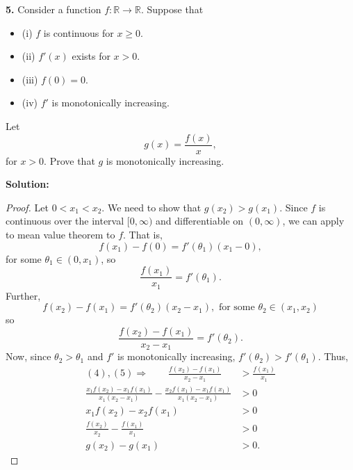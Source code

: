 \documentclass[11pt]{article}
\begin{document}
{\bf 5.} Consider a function $f:\mathbb{R} \rightarrow \mathbb{R}$. Suppose that 
\begin{itemize}[label={},leftmargin=4mm, itemsep=0.5em, parsep=1em]
  \item (i) $f$ is continuous for $x \geq 0$.
  \item (ii) $f'(x)$ exists for $x > 0$.
  \item (iii) $f(0) = 0$.
  \item (iv) $f'$ is monotonically increasing.
\end{itemize}
Let 
\[ g(x) = \frac{f(x)}{x}, \]
for $x > 0$. Prove that $g$ is monotonically increasing.

{\bf Solution:} 
\begin{proof}
  Let $0 < x_{1} < x_{2}$. We need to show that $g(x_{2}) > g(x_{1})$. Since $f$
  is continuous over the interval $[0, \infty)$ and differentiable on $(0,
    \infty)$, we can apply to mean value theorem to $f$. That is,
  \[ f(x_{1}) - f(0) = f'(\theta_{1})(x_{1} - 0), \]
  for some $\theta_{1} \in (0, x_{1})$, so 
  \begin{equation}
    \frac{f(x_{1})}{x_{1}} = f'(\theta_{1}).
  \end{equation}
  Further,
  \[ f(x_{2}) - f(x_{1}) = f'(\theta_{2})(x_{2} - x_{1}), \text{ for some
  }\theta_{2} \in (x_{1}, x_{2}) \]
  so 
  \begin{equation}
    \frac{f(x_{2}) - f(x_{1})}{x_{2} - x_{1}} = f'(\theta_{2}).
  \end{equation}
  Now, since $\theta_{2} > \theta_{1}$ and $f'$ is monotonically increasing, 
  $f'(\theta_{2}) > f'(\theta_{1})$. Thus,
  \begin{align*}
    (4), (5) \Rightarrow \qquad \frac{f(x_{2}) - f(x_{1})}{x_{2} - x_{1}} & >
    \frac{f(x_{1})}{x_{1}} \\
    \frac{x_{1}f(x_{2}) - x_{1}f(x_{1})}{x_{1}(x_{2} - x_{1})} -
    \frac{x_{2}f(x_{1}) - x_{1}f(x_{1})}{x_{1}(x_{2} - x_{1})} & > 0 \\
    x_{1}f(x_{2}) - x_{2}f(x_{1}) & > 0 \\ 
    \frac{f(x_{2})}{x_{2}} - \frac{f(x_{1})}{x_{1}} & > 0 \\
    g(x_{2}) - g(x_{1}) & > 0.
  \end{align*}
\end{proof}
\end{document}
